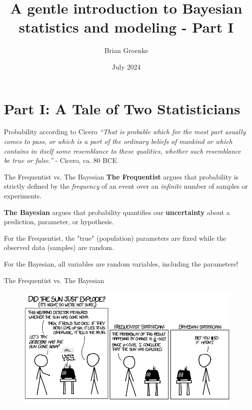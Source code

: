 \documentclass[12pt,aspectratio=169]{beamer}
\title{A gentle introduction to Bayesian statistics and modeling - Part I}
\author{Brian Groenke}
\date{July 2024}
\begin{document}
\maketitle
\addtocounter{framenumber}{-1}


\section{Part I: A Tale of Two Statisticians}

\begin{frame}{Probability according to Cicero}
    \centering
    \textit{``That is probable which for the most part usually comes to pass, or which is a part of the ordinary beliefs of mankind or which contains in itself some resemblance to these qualities, whether such resemblance be true or false.''}
    - Cicero, ca. 80 BCE
\end{frame}

\begin{frame}{The Frequentist vs. The Bayesian}
    \textbf{The Frequentist} argues that probability is strictly defined by the \textit{frequency} of an event over an \textit{infinite} number of samples or experiments.
    \pause\newline
    
    \textbf{The Bayesian} argues that probability quantifies our \textbf{uncertainty} about a prediction, parameter, or hypothesis.
    \pause\newline
    
    For the Frequentist, the "true" (population) parameters are fixed while the observed data (samples) are random.
    \pause\newline
    
    For the Bayesian, all variables are random variables, including the parameters!
\end{frame}  

\begin{frame}{The Frequentist vs. The Bayesian}
    \begin{figure}
        \centering
        \includegraphics[scale=0.44]{figs/frequentists_vs_bayesians_landscape.png}
    \end{figure}
\end{frame}
\end{document}
